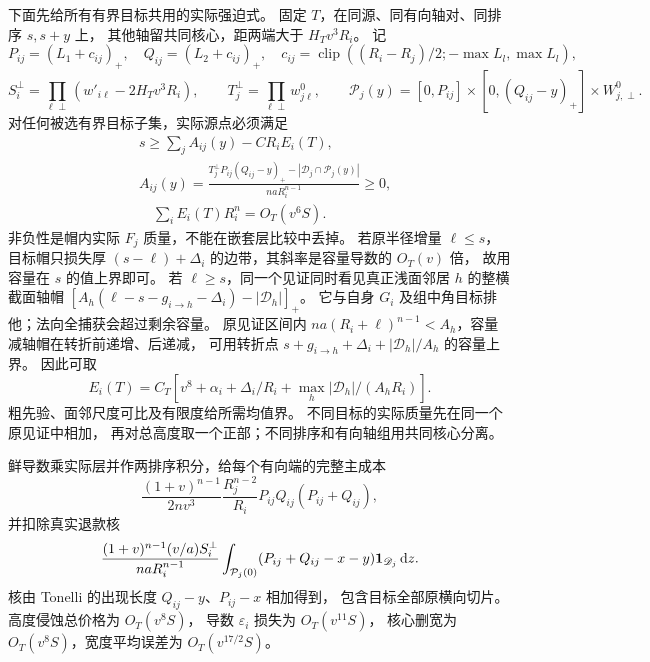 下面先给所有有界目标共用的实际强迫式。
固定 \(T\)，在同源、同有向轴对、同排序 \(s,s+y\) 上，
其他轴留共同核心，距两端大于 \(H_Tv^3R_i\)。
记
\[
 P_{ij}=(L_1+c_{ij})_+,\quad Q_{ij}=(L_2+c_{ij})_+,\quad
 c_{ij}=\operatorname{clip}((R_i-R_j)/2;-\max L_l,\max L_l),
\]
\[
 S_i^\perp=\prod_{\ell\perp}(w'_{i\ell}-2H_Tv^3R_i),\qquad
 T_j^\perp=\prod_{\ell\perp}w^0_{j\ell},\qquad
 \mathcal P_j(y)=[0,P_{ij}]\times[0,(Q_{ij}-y)_+]\times W^0_{j,\perp}.
\]
对任何被选有界目标子集，实际源点必须满足
\begin{equation}\label{eighth:shared-height}
 \begin{aligned}
 &s\ge\sum_j A_{ij}(y)-CR_iE_i(T),\qquad\\
 &A_{ij}(y)=
 \frac{T_j^\perp P_{ij}(Q_{ij}-y)_+-|\mathscr D_j\cap\mathcal P_j(y)|}
      {naR_i^{n-1}}\ge0,\\
 &\quad \sum_iE_i(T)R_i^n=O_T(v^6S).
 \end{aligned}
\end{equation}
非负性是帽内实际 \(F_j\) 质量，不能在嵌套层比较中丢掉。
若原半径增量 \(\ell\le s\)，目标帽只损失厚
\((s-\ell)+\Delta_i\) 的边带，其斜率是容量导数的 \(O_T(v)\) 倍，
故用容量在 \(s\) 的值上界即可。
若 \(\ell\ge s\)，同一个见证同时看见真正浅面邻居 \(h\) 的整横截面轴帽
\([A_h(\ell-s-g_{i\to h}-\Delta_i)-|\mathscr D_h|]_+\)。
它与自身 \(G_i\) 及组中角目标排他；法向全捕获会超过剩余容量。
原见证区间内 \(na(R_i+\ell)^{n-1}<A_h\)，容量减轴帽在转折前递增、后递减，
可用转折点 \(s+g_{i\to h}+\Delta_i+|\mathscr D_h|/A_h\) 的容量上界。
因此可取
\[
 E_i(T)=C_T\left[v^8+\alpha_i+\Delta_i/R_i+
                    \max_h|\mathscr D_h|/(A_hR_i)\right].
\]
粗先验、面邻尺度可比及有限度给所需均值界。
不同目标的实际质量先在同一个原见证中相加，
再对总高度取一个正部；不同排序和有向轴组用共同核心分离。

鲜导数乘实际层并作两排序积分，给每个有向端的完整主成本
\begin{equation}\label{eighth:nominal-cost}
 \frac{(1+v)^{n-1}}{2nv^3}\frac{R_j^{n-2}}{R_i}
                    P_{ij}Q_{ij}(P_{ij}+Q_{ij}),
\end{equation}
并扣除真实退款核
\begin{equation}\label{eighth:refund-kernel}
 \frac{(1+v)^{n-1}(v/a)S_i^\perp}{naR_i^{n-1}}
 \int_{\mathcal P_j(0)}
 (P_{ij}+Q_{ij}-x-y)\mathbf 1_{\mathscr D_j}\,\mathrm d z .
\end{equation}
核由 Tonelli 的出现长度 \(Q_{ij}-y\)、\(P_{ij}-x\) 相加得到，
包含目标全部原横向切片。高度侵蚀总价格为 \(O_T(v^8S)\)，
导数 \(\varepsilon_i\) 损失为 \(O_T(v^{11}S)\)，
核心删宽为 \(O_T(v^8S)\)，宽度平均误差为 \(O_T(v^{17/2}S)\)。

